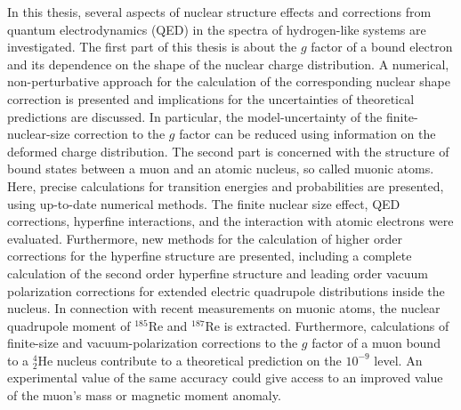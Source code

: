 
{\small
In this thesis, several aspects of nuclear structure effects and corrections from quantum electrodynamics (QED) in the spectra of hydrogen-like systems are investigated. The first part of this thesis is about the $g$ factor of a bound electron and its dependence on the shape of the nuclear charge distribution. 
A numerical, non-perturbative approach for the calculation of the corresponding nuclear shape correction is presented and implications for the uncertainties of theoretical predictions are discussed. In particular, the model-uncertainty of the finite-nuclear-size correction to the $g$ factor can be reduced using information on the deformed charge distribution.
The second part is concerned with the structure of bound states between a muon and an atomic nucleus, so called muonic atoms. Here, precise calculations for transition energies and probabilities are presented, using up-to-date numerical methods. The finite nuclear size effect, QED corrections, hyperfine interactions, and the interaction with atomic electrons were evaluated. 
Furthermore, new methods for the calculation of higher order corrections for the hyperfine structure are presented, including a complete calculation of the second order hyperfine structure and leading order vacuum polarization corrections for extended electric quadrupole distributions inside the nucleus. 
In connection with recent measurements on muonic atoms, the nuclear quadrupole moment of $^{185}$Re and $^{187}$Re is extracted.
Furthermore, calculations of finite-size and vacuum-polarization corrections to the $g$ factor of a muon bound to a $^{4}_2$He nucleus contribute to a theoretical prediction on the $10^{-9}$ level. An experimental value of the same accuracy could give access to an improved value of the muon's mass or magnetic moment anomaly.
}

\thispagestyle{empty}
